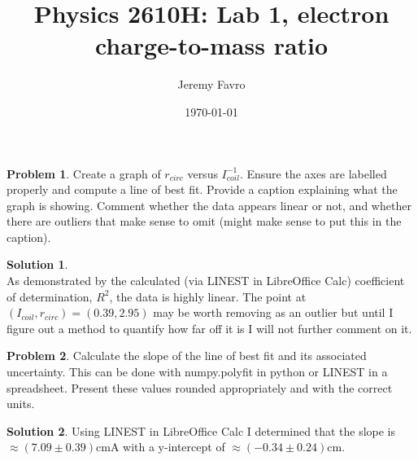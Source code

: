 \documentclass[10pt]{article}
\title{Physics 2610H: Lab 1, electron charge-to-mass ratio}
\author{Jeremy Favro}
\date{\today}
\theoremstyle{definition}
\newtheorem{problem}{Problem}
\newtheorem{soln}{Solution}
\begin{document}
\maketitle

\setcounter{problem}{4}
\setcounter{soln}{4}
\begin{problem}
Create a graph of $r_{circ}$ versus $I_{coil}^{-1}$. Ensure the axes are labelled properly and compute a line of best fit.
Provide a caption explaining what the graph is showing. Comment whether the data appears linear or not,
and whether there are outliers that make sense to omit (might make sense to put this in the caption).
\end{problem}
\begin{soln}~\\
  As demonstrated by the calculated (via LINEST in LibreOffice Calc) coefficient of determination, $R^2$, the data is highly linear. The point at $(I_{coil},r_{circ})=(0.39, 2.95)$ may be worth removing as an
  outlier but until I figure out a method to quantify how far off it is I will not further comment on it.
\end{soln}

\begin{problem}
Calculate the slope of the line of best fit and its associated uncertainty. This can be done with numpy.polyfit in python or LINEST in a spreadsheet.
Present these values rounded appropriately and with the correct units.
\end{problem}
\begin{soln}
  Using LINEST in LibreOffice Calc I determined that the slope is $\approx(7.09\pm0.39)\unit{\centi\meter\ampere}$ with a y-intercept of $\approx(-0.34\pm0.24)\unit{\centi\meter}$.
\end{soln}
\end{document}
